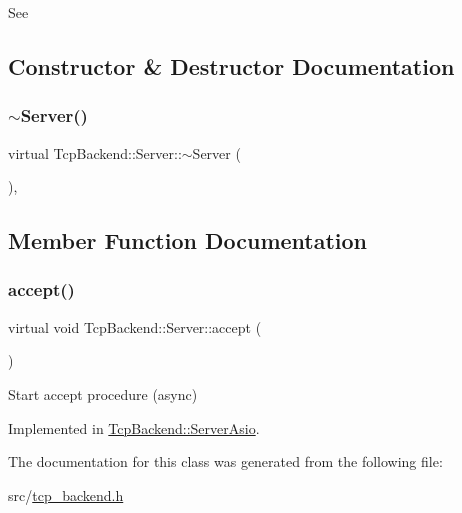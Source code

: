 See  

\subsection{Constructor \& Destructor Documentation}
\mbox{\label{classTcpBackend_1_1Server_a567fe5cf7bc9ed07eec98bc21ba5b294}} 
\subsubsection{\texorpdfstring{$\sim$\+Server()}{~Server()}}
{\footnotesize\ttfamily virtual Tcp\+Backend\+::\+Server\+::$\sim$\+Server (\begin{DoxyParamCaption}{ }\end{DoxyParamCaption})\hspace{0.3cm}{\ttfamily [virtual]}, {\ttfamily [default]}}



\subsection{Member Function Documentation}
\mbox{\label{classTcpBackend_1_1Server_aab685a052c45a25ecc9a30ec14bf91e9}} 
\subsubsection{\texorpdfstring{accept()}{accept()}}
{\footnotesize\ttfamily virtual void Tcp\+Backend\+::\+Server\+::accept (\begin{DoxyParamCaption}{ }\end{DoxyParamCaption})\hspace{0.3cm}{\ttfamily [pure virtual]}}



Start accept procedure (async) 



Implemented in \hyperlink{classTcpBackend_1_1ServerAsio_adc51e0fe964cfaf725d4c1b999dd36c1}{Tcp\+Backend\+::\+Server\+Asio}.



The documentation for this class was generated from the following file\+:\begin{DoxyCompactItemize}
\item 
src/\hyperlink{tcp__backend_8h}{tcp\+\_\+backend.\+h}\end{DoxyCompactItemize}
